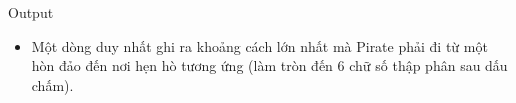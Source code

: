 Output  
\begin{itemize}
	\item     Một dòng duy nhất ghi ra khoảng cách lớn nhất mà Pirate phải đi từ một hòn đảo đến nơi hẹn hò tương ứng (làm tròn đến 6 chữ số thập phân sau dấu chấm).   
\end{itemize}